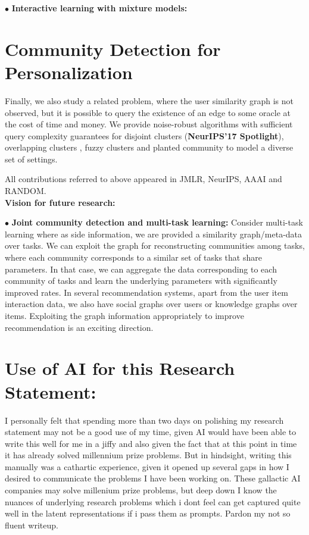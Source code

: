 \documentclass[11pt,a4paper,sans,usenames,dvipsnames]{moderncv} %
\begin{document}
$\bullet{}$ \textbf{Interactive learning with mixture models:}

\section{Community Detection for Personalization}

Finally, we also study a related problem, where the user similarity graph is not observed, but it is possible to query the existence of an edge to some oracle at the cost of time and money. We provide noise-robust algorithms with sufficient query complexity guarantees for disjoint clusters \cite{mazumdar2017semisupervised} (\textbf{NeurIPS'17 Spotlight}), overlapping clusters \cite{huleihel2019same}, fuzzy clusters \cite{huleihel2021fuzzy} and planted community \cite{huleihel2021random,mazumdar2021support} to model a diverse set of settings.

All contributions referred to above appeared in JMLR, NeurIPS, AAAI and RANDOM. \\

\noindent \textbf{Vision for future research:}

$\bullet{}$ \textbf{Joint community detection and multi-task learning:} Consider multi-task learning where as side information, we are provided a similarity graph/meta-data over tasks. We can exploit the graph for reconstructing communities among tasks, where each community corresponds to a similar set of tasks that share parameters. In that case, we can aggregate the data corresponding to each community of tasks and learn the underlying parameters with significantly improved rates. In several recommendation systems, apart from the user item interaction data, we also have social graphs over users or knowledge graphs over items. Exploiting the graph information appropriately to improve recommendation is an exciting direction.

\section{Use of AI for this Research Statement:}

I personally felt that spending more than two days on polishing my research statement may not be a good use of my time, given AI would have been able to write this well for me in a jiffy and also given the fact that at this point in time it has already solved millennium prize problems. But in hindsight, writing this manually was a cathartic experience, given it opened up several gaps in how I desired to communicate the problems I have been working on. These gallactic AI companies may solve millenium prize problems, but deep down I know the nuances of underlying research problems which i dont feel can get captured quite well in the latent representations if i pass them as prompts. Pardon my not so fluent writeup.



\end{document}
